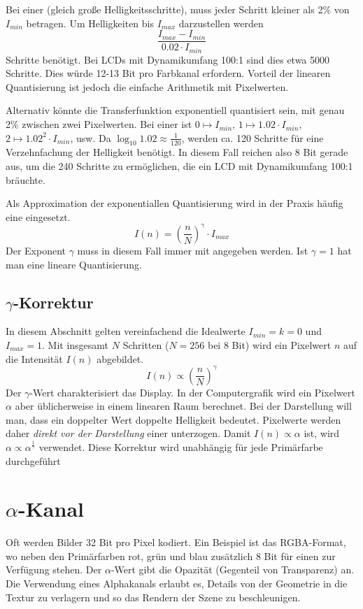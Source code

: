 Bei einer  (gleich große Helligkeitsschritte), muss jeder Schritt kleiner als 2\% von $I_{min}$ betragen.
Um Helligkeiten bis $I_{max}$ darzustellen werden
\[
	\frac{I_{max} - I_{min}}{0.02 \cdot I_{min}}
\]
Schritte benötigt.
Bei LCDs mit Dynamikumfang 100:1 sind dies etwa 5000 Schritte.
Dies würde 12-13 Bit pro Farbkanal erfordern.
Vorteil der linearen Quantisierung ist jedoch die einfache Arithmetik mit Pixelwerten.

Alternativ könnte die Transferfunktion exponentiell quantisiert sein, mit genau 2\% zwischen zwei Pixelwerten.
Bei einer  ist $0 \mapsto I_{min}$, $1 \mapsto 1.02 \cdot I_{min}$, $2 \mapsto 1.02^2 \cdot I_{min}$, usw.
Da $\log_{10} 1.02 \approx \frac{1}{120}$, werden ca. 120 Schritte für eine Verzehnfachung der Helligkeit benötigt.
In diesem Fall reichen also 8 Bit gerade aus, um die 240 Schritte zu ermöglichen, die ein LCD mit Dynamikumfang 100:1 bräuchte.

Als Approximation der exponentiallen Quantisierung wird in der Praxis häufig eine  eingesetzt.
\[
	I(n) = \left(\frac{n}{N}\right)^\gamma \cdot I_{max}
\]
Der Exponent $\gamma$ muss in diesem Fall immer mit angegeben werden.
Ist $\gamma = 1$ hat man eine lineare Quantisierung.

\subsection{$\gamma$-Korrektur}
In diesem Abschnitt gelten vereinfachend die Idealwerte $I_{min} = k = 0$ und $I_{max} = 1$.
Mit insgesamt $N$ Schritten ($N = 256$ bei $8$ Bit) wird ein Pixelwert $n$ auf die Intensität $I(n)$ abgebildet.
\[
	I(n) \propto \left(\frac{n}{N}\right)^\gamma
\]
Der $\gamma$-Wert charakterisiert das Display.
In der Computergrafik wird ein Pixelwert $\alpha$ aber üblicherweise in einem linearen Raum berechnet.
Bei der Darstellung will man, dass ein doppelter Wert doppelte Helligkeit bedeutet.
Pixelwerte werden daher \emph{direkt vor der Darstellung} einer  unterzogen.
Damit $I(n) \propto \alpha$ ist, wird $\alpha \propto \alpha^{\frac{1}{\gamma}}$ verwendet.
Diese Korrektur wird unabhängig für jede Primärfarbe durchgeführt

\section{$\alpha$-Kanal}
Oft werden Bilder 32 Bit pro Pixel kodiert.
Ein Beispiel ist das RGBA-Format, wo neben den Primärfarben rot, grün und blau zusätzlich 8 Bit für einen  zur Verfügung stehen.
Der $\alpha$-Wert gibt die Opazität (Gegenteil von Transparenz) an.
Die Verwendung eines Alphakanals erlaubt es, Details von der Geometrie in die Textur zu verlagern und so das Rendern der Szene zu beschleunigen.


